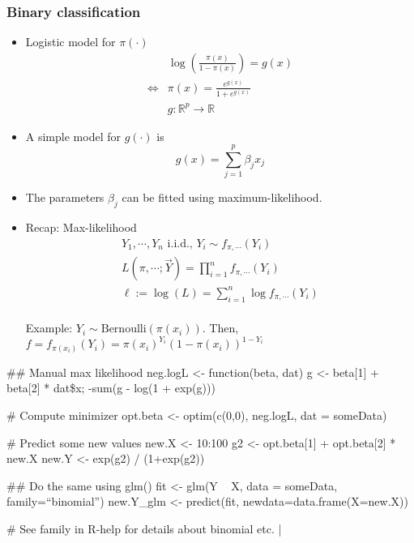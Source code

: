 \subsubsection{Binary classification}
\begin{theory}
 \begin{itemize}
  \item Logistic model for $\pi(\cdot)$
        \begin{align*}
                         & \log\left( \frac{\pi(x)}{1-\pi(x)} \right) = g(x)\\
         \Leftrightarrow & \pi(x) = \frac{e^{g(x)}}{1+e^{g(x)}}\\
                         & g: \mathbb{R}^p \rightarrow \mathbb{R}
        \end{align*}
  \item A simple model for $g(\cdot)$ is
        \begin{equation*}
         g(x) = \sum_{j=1}^p \beta_jx_j
        \end{equation*}
  \item The parameters $\beta_j$ can be fitted using maximum-likelihood.
  \item Recap: Max-likelihood
        \begin{gather*}
         Y_1, \cdots, Y_n \text{ i.i.d., } Y_i \sim f_{\pi, \cdots}(Y_i)\\
         L(\pi, \cdots; \vec{Y}) = \prod_{i=1}^n f_{\pi, \cdots}(Y_i)\\
         \ell := \log(L) = \sum_{i=1}^n \log f_{\pi, \cdots}(Y_i)
        \end{gather*}\\
        Example: $Y_i \sim \text{Bernoulli}(\pi(x_i))$. Then, $f = f_{\pi(x_i)}(Y_i) = \pi(x_i)^{Y_i} (1-\pi(x_i))^{1-Y_i}$
 \end{itemize}
\end{theory}

\begin{code}
 ## Manual max likelihood
 neg.logL <- function(beta, dat){
  g <- beta[1] + beta[2] * dat\$x;
  -sum(g - log(1 + exp(g)))
 }
 
 # Compute minimizer
 opt.beta <- optim(c(0,0), neg.logL, dat = someData)
 
 # Predict some new values
 new.X <- 10:100
 g2 <- opt.beta[1] + opt.beta[2] * new.X
 new.Y <- exp(g2) / (1+exp(g2))
 
 ## Do the same using glm()
 fit <- glm(Y ~ X, data = someData, family=``binomial'')
 new.Y_glm <- predict(fit, newdata=data.frame(X=new.X))
 
 # See family in R-help for details about binomial etc.
 |%
\end{code}


